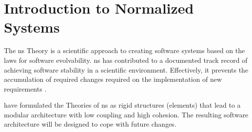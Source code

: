 \section{Introduction to Normalized Systems} \label{sec_inro_ns}

The \gls{ns} Theory is a scientific approach to creating software systems based on the
laws for software evolvability. \gls{ns} has contributed to a documented track record of
achieving software stability in a scientific environment. Effectively, it prevents the
accumulation of required changes required on the implementation of new requirements
\parencite[]{mannaert_normalized_2009}. 

\citeauthor[]{mannaert_normalized_2009} have formulated the Theories of \gls{ns} as rigid
structures (elements) that lead to a modular architecture with low coupling and high
cohesion. The resulting software architecture will be designed to cope with future
changes.